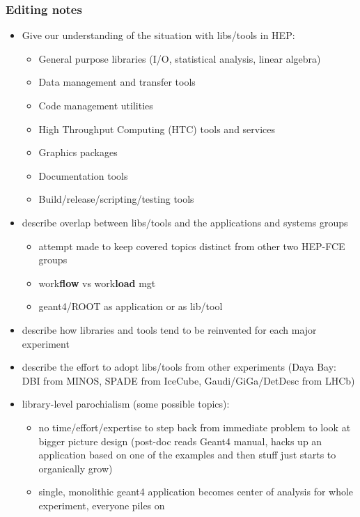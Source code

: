 \subsubsection{Editing notes}


\begin{itemize}
\item Give our understanding of the situation with libs/tools in HEP:
  \begin{itemize}
  \item General purpose libraries (I/O, statistical analysis, linear algebra)
  \item Data management and transfer tools
  \item Code management utilities
  \item High Throughput Computing (HTC) tools and services
  \item Graphics packages
  \item Documentation tools
  \item Build/release/scripting/testing tools
  \end{itemize}
\item describe overlap between libs/tools and the applications and systems groups
  \begin{itemize}
  \item attempt made to keep covered topics distinct from other two HEP-FCE groups
  \item work\textbf{flow} vs work\textbf{load} mgt
  \item geant4/ROOT as application or as lib/tool
  \end{itemize}
\item describe how libraries and tools tend to be reinvented for each major experiment 
\item describe the effort to adopt libs/tools from other experiments (Daya Bay: DBI from MINOS, SPADE from IceCube, Gaudi/GiGa/DetDesc from LHCb)
\item library-level parochialism (some possible topics):
  \begin{itemize}
  \item no time/effort/expertise to step back from immediate problem to look at bigger picture design (post-doc reads Geant4 manual, hacks up an application based on one of the examples and then stuff just starts to organically grow)
  \item single, monolithic geant4 application becomes center of analysis for whole experiment, everyone piles on

\end{itemize}
\end{itemize}

